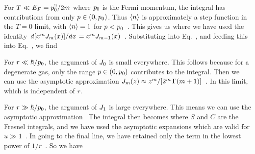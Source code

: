 {	For $T \ll E_F = p_0^2 / 2m$ where $p_0$ is the Fermi momentum, the integral has contributions from only $p \in (0, p_0)$.  Thus $\evn$ is approximately a step function in the $T = 0$ limit, with $\evn = 1$ for $p < p_0$~\cite[p.~357]{Landau}.  This gives us
	where we have used the identity $\dv*{[ x^m J_m(x) ]}{x} = x^m J_{m-1}(x)$~\cite{BesselJ}.  Substituting into Eq.~,
	and feeding this into Eq.~, we find
	
	For $r \ll \hbar / p_0$, the argument of $J_0$ is small everywhere.  This follows because for a degenerate gas, only the range $p \in (0, p_0)$ contributes to the integral.  Then we can use the asymptotic approximation $J_m(z) \approx z^m / [ 2^m \,\Gamma(m + 1) ]$~\cite{BesselJ}.  In this limit,
	which is independent of $r$.
	
	For $r \gg \hbar / p_0$, the argument of $J_1$ is large everywhere.  This means we can use the asymptotic approximation~\cite{BesselJ}
	The integral then becomes
	where $S$ and $C$ are the Fresnel integrals, and we have used the asymptotic expansions
	which are valid for $u \gg 1$~\cite{Fresnel}.  In going to the final line, we have retained only the term in the lowest power of $1 / r$~\cite[p.~357]{Landau}.  So we have
	
}
